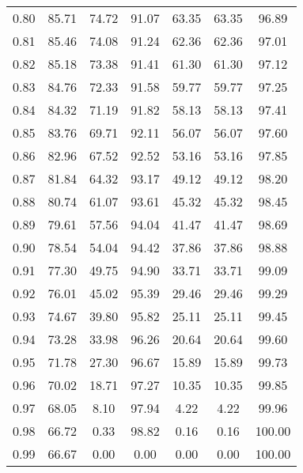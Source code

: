\begin{tabular}{|c|c|c|c|c|c|c|}
      0.80 &     85.71 &     74.72 &      91.07 &   63.35 &      63.35 &         96.89 \\
      0.81 &     85.46 &     74.08 &      91.24 &   62.36 &      62.36 &         97.01 \\
      0.82 &     85.18 &     73.38 &      91.41 &   61.30 &      61.30 &         97.12 \\
      0.83 &     84.76 &     72.33 &      91.58 &   59.77 &      59.77 &         97.25 \\
      0.84 &     84.32 &     71.19 &      91.82 &   58.13 &      58.13 &         97.41 \\
      0.85 &     83.76 &     69.71 &      92.11 &   56.07 &      56.07 &         97.60 \\
      0.86 &     82.96 &     67.52 &      92.52 &   53.16 &      53.16 &         97.85 \\
      0.87 &     81.84 &     64.32 &      93.17 &   49.12 &      49.12 &         98.20 \\
      0.88 &     80.74 &     61.07 &      93.61 &   45.32 &      45.32 &         98.45 \\
      0.89 &     79.61 &     57.56 &      94.04 &   41.47 &      41.47 &         98.69 \\
      0.90 &     78.54 &     54.04 &      94.42 &   37.86 &      37.86 &         98.88 \\
      0.91 &     77.30 &     49.75 &      94.90 &   33.71 &      33.71 &         99.09 \\
      0.92 &     76.01 &     45.02 &      95.39 &   29.46 &      29.46 &         99.29 \\
      0.93 &     74.67 &     39.80 &      95.82 &   25.11 &      25.11 &         99.45 \\
      0.94 &     73.28 &     33.98 &      96.26 &   20.64 &      20.64 &         99.60 \\
      0.95 &     71.78 &     27.30 &      96.67 &   15.89 &      15.89 &         99.73 \\
      0.96 &     70.02 &     18.71 &      97.27 &   10.35 &      10.35 &         99.85 \\
      0.97 &     68.05 &      8.10 &      97.94 &    4.22 &       4.22 &         99.96 \\
      0.98 &     66.72 &      0.33 &      98.82 &    0.16 &       0.16 &        100.00 \\
      0.99 &     66.67 &      0.00 &       0.00 &    0.00 &       0.00 &        100.00 \\
\bottomrule
\end{tabular}
